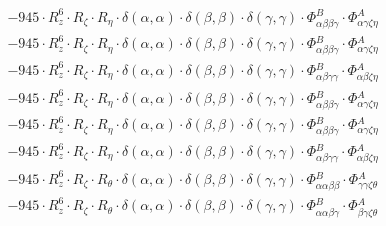 \documentclass{article}
\begin{document}
\begin{subequations}
\begin{gather}
\begin{array}{c}
 \\[0.2em] 		 - 945 \cdot R_{z}^{6} \cdot R_{\zeta{}} \cdot R_{\eta{}} \cdot \delta{}\left(\alpha{}, \alpha{}\right) \cdot \delta{}\left(\beta{}, \beta{}\right) \cdot \delta{}\left(\gamma{}, \gamma{}\right) \cdot \Phi{}^{B}_{\alpha{}\beta{}\beta{}\gamma{}} \cdot \Phi{}^{A}_{\alpha{}\gamma{}\zeta{}\eta{}} 
 \\[0.2em] 		 - 945 \cdot R_{z}^{6} \cdot R_{\zeta{}} \cdot R_{\eta{}} \cdot \delta{}\left(\alpha{}, \alpha{}\right) \cdot \delta{}\left(\beta{}, \beta{}\right) \cdot \delta{}\left(\gamma{}, \gamma{}\right) \cdot \Phi{}^{B}_{\alpha{}\beta{}\beta{}\gamma{}} \cdot \Phi{}^{A}_{\alpha{}\gamma{}\zeta{}\eta{}} 
 \\[0.2em] 		 - 945 \cdot R_{z}^{6} \cdot R_{\zeta{}} \cdot R_{\eta{}} \cdot \delta{}\left(\alpha{}, \alpha{}\right) \cdot \delta{}\left(\beta{}, \beta{}\right) \cdot \delta{}\left(\gamma{}, \gamma{}\right) \cdot \Phi{}^{B}_{\alpha{}\beta{}\gamma{}\gamma{}} \cdot \Phi{}^{A}_{\alpha{}\beta{}\zeta{}\eta{}} 
 \\[0.2em] 		 - 945 \cdot R_{z}^{6} \cdot R_{\zeta{}} \cdot R_{\eta{}} \cdot \delta{}\left(\alpha{}, \alpha{}\right) \cdot \delta{}\left(\beta{}, \beta{}\right) \cdot \delta{}\left(\gamma{}, \gamma{}\right) \cdot \Phi{}^{B}_{\alpha{}\beta{}\beta{}\gamma{}} \cdot \Phi{}^{A}_{\alpha{}\gamma{}\zeta{}\eta{}} 
 \\[0.2em] 		 - 945 \cdot R_{z}^{6} \cdot R_{\zeta{}} \cdot R_{\eta{}} \cdot \delta{}\left(\alpha{}, \alpha{}\right) \cdot \delta{}\left(\beta{}, \beta{}\right) \cdot \delta{}\left(\gamma{}, \gamma{}\right) \cdot \Phi{}^{B}_{\alpha{}\beta{}\beta{}\gamma{}} \cdot \Phi{}^{A}_{\alpha{}\gamma{}\zeta{}\eta{}} 
 \\[0.2em] 		 - 945 \cdot R_{z}^{6} \cdot R_{\zeta{}} \cdot R_{\eta{}} \cdot \delta{}\left(\alpha{}, \alpha{}\right) \cdot \delta{}\left(\beta{}, \beta{}\right) \cdot \delta{}\left(\gamma{}, \gamma{}\right) \cdot \Phi{}^{B}_{\alpha{}\beta{}\gamma{}\gamma{}} \cdot \Phi{}^{A}_{\alpha{}\beta{}\zeta{}\eta{}} 
 \\[0.2em] 		 - 945 \cdot R_{z}^{6} \cdot R_{\zeta{}} \cdot R_{\theta{}} \cdot \delta{}\left(\alpha{}, \alpha{}\right) \cdot \delta{}\left(\beta{}, \beta{}\right) \cdot \delta{}\left(\gamma{}, \gamma{}\right) \cdot \Phi{}^{B}_{\alpha{}\alpha{}\beta{}\beta{}} \cdot \Phi{}^{A}_{\gamma{}\gamma{}\zeta{}\theta{}} 
 \\[0.2em] 		 - 945 \cdot R_{z}^{6} \cdot R_{\zeta{}} \cdot R_{\theta{}} \cdot \delta{}\left(\alpha{}, \alpha{}\right) \cdot \delta{}\left(\beta{}, \beta{}\right) \cdot \delta{}\left(\gamma{}, \gamma{}\right) \cdot \Phi{}^{B}_{\alpha{}\alpha{}\beta{}\gamma{}} \cdot \Phi{}^{A}_{\beta{}\gamma{}\zeta{}\theta{}} 

\end{array}
\end{gather}
\end{subequations}
\end{document}
